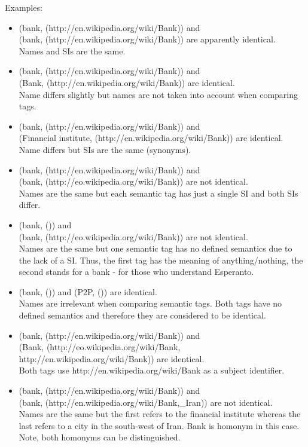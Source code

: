 Examples:
\begin{itemize}
    \item (bank, (http://en.wikipedia.org/wiki/Bank)) and \\ (bank, (http://en.wikipedia.org/wiki/Bank)) are apparently identical. \\ Names and SIs are the same.

    \item (bank, (http://en.wikipedia.org/wiki/Bank)) and \\ (Bank, (http://en.wikipedia.org/wiki/Bank)) are identical. \\ Name differs slightly but names are not taken into account when comparing tags.

    \item (bank, (http://en.wikipedia.org/wiki/Bank)) and \\ (Financial institute, (http://en.wikipedia.org/wiki/Bank)) are identical. \\ Name differs but SIs are the same (synonyms).

    \item (bank, (http://en.wikipedia.org/wiki/Bank)) and \\ (bank, (http://eo.wikipedia.org/wiki/Bank)) are not identical. \\ Names are the same but each semantic tag has just a single SI and both SIs differ.

    \item (bank, ()) and \\ (bank, (http://eo.wikipedia.org/wiki/Bank)) are not identical. \\ Names are the same but one semantic tag has no defined semantics due to the lack of a SI. Thus, the first tag has the meaning of anything/nothing, the second stands for a bank - for those who understand Esperanto.

    \item (bank, ()) and (P2P, ()) are identical. \\ Names are irrelevant when comparing semantic tags. Both tags have no defined semantics and therefore they are considered to be identical.

    \item (bank, (http://en.wikipedia.org/wiki/Bank)) and \\ (Bank, (http://eo.wikipedia.org/wiki/Bank, \\ http://en.wikipedia.org/wiki/Bank)) are identical. \\ Both tags use http://en.wikipedia.org/wiki/Bank as a subject identifier. 

    \item (bank, (http://en.wikipedia.org/wiki/Bank)) and \\ (bank, (http://en.wikipedia.org/wiki/Bank,\_Iran)) are not identical. \\ Names are the same but the first refers to the financial institute whereas the last refers to a city in the south-west of Iran. Bank is homonym in this case. Note, both homonyms can be distinguished.

\end{itemize}

